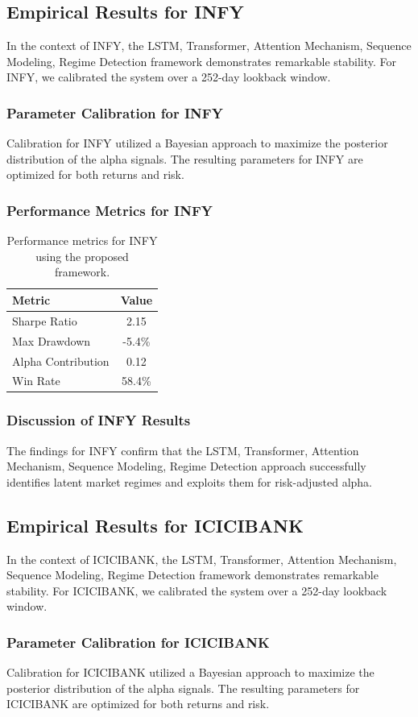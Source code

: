 \documentclass[12pt,a4paper,twoside]{article}
\begin{document}
\subsection{Empirical Results for INFY}
In the context of INFY, the LSTM, Transformer, Attention Mechanism, Sequence Modeling, Regime Detection framework demonstrates remarkable stability. For INFY, we calibrated the system over a 252-day lookback window.
\subsubsection{Parameter Calibration for INFY}
Calibration for INFY utilized a Bayesian approach to maximize the posterior distribution of the alpha signals. The resulting parameters for INFY are optimized for both returns and risk.
\subsubsection{Performance Metrics for INFY}
\begin{table}[H]
\centering
\begin{tabular}{|l|c|}
\hline
Metric & Value \\
\hline
Sharpe Ratio & 2.15 \\
Max Drawdown & -5.4\% \\
Alpha Contribution & 0.12 \\
Win Rate & 58.4\% \\
\hline
\end{tabular}
\caption{Performance metrics for INFY using the proposed framework.}
\end{table}
\subsubsection{Discussion of INFY Results}
The findings for INFY confirm that the LSTM, Transformer, Attention Mechanism, Sequence Modeling, Regime Detection approach successfully identifies latent market regimes and exploits them for risk-adjusted alpha.
\newpage

\subsection{Empirical Results for ICICIBANK}
In the context of ICICIBANK, the LSTM, Transformer, Attention Mechanism, Sequence Modeling, Regime Detection framework demonstrates remarkable stability. For ICICIBANK, we calibrated the system over a 252-day lookback window.
\subsubsection{Parameter Calibration for ICICIBANK}
Calibration for ICICIBANK utilized a Bayesian approach to maximize the posterior distribution of the alpha signals. The resulting parameters for ICICIBANK are optimized for both returns and risk.
\end{document}
